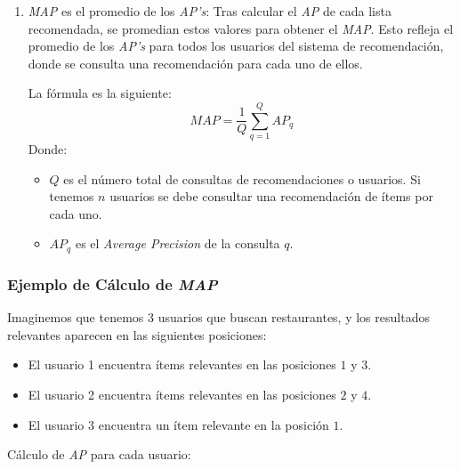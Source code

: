 \documentclass[11pt,a4paper,twoside]{thesis}
\begin{document}
\begin{enumerate}
	\item \textit{MAP} es el promedio de los \textit{AP's}: Tras calcular el \textit{AP} de cada lista recomendada, se promedian estos valores para obtener el \textit{MAP}. Esto refleja el promedio de los \textit{AP's} para todos los usuarios del sistema de recomendación, donde se consulta una recomendación para cada uno de ellos.

	      La fórmula es la siguiente:
	      \[
		      MAP = \frac{1}{Q} \sum_{q=1}^{Q} AP_q
	      \]
	      Donde:
	      \begin{itemize}
		      \item \( Q \) es el número total de consultas de recomendaciones o usuarios. Si tenemos $n$ usuarios se debe consultar una recomendación de ítems por cada uno.
		      \item \( AP_q \) es el \textit{Average Precision} de la consulta \( q \).
	      \end{itemize}
\end{enumerate}

\subsubsection{Ejemplo de Cálculo de \textit{MAP}}

Imaginemos que tenemos 3 usuarios que buscan restaurantes, y los resultados relevantes aparecen en las siguientes posiciones:

\begin{itemize}
	\item El usuario 1 encuentra ítems relevantes en las posiciones $1$ y $3$.
	\item El usuario 2 encuentra ítems relevantes en las posiciones $2$ y $4$.
	\item El usuario 3 encuentra un ítem relevante en la posición $1$.
\end{itemize}

Cálculo de \textit{AP} para cada usuario:
\end{document}
